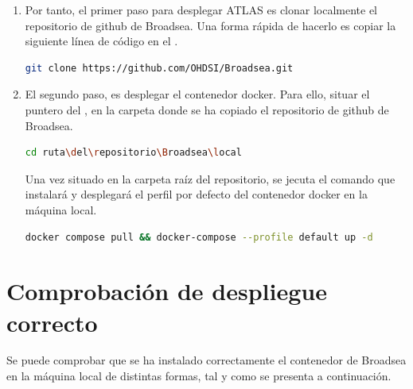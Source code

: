 \begin{enumerate}
    \item Por tanto, el primer paso para desplegar ATLAS es clonar localmente el repositorio de github de Broadsea. Una forma rápida de hacerlo es copiar la siguiente línea de código en el .

\begin{lstlisting}[language=sh]
        git clone https://github.com/OHDSI/Broadsea.git
\end{lstlisting}

    \item El segundo paso, es desplegar el contenedor docker. Para ello, situar el puntero del , en la carpeta donde se ha copiado el repositorio de github de Broadsea.

\begin{lstlisting}[language=sh]
        cd ruta\del\repositorio\Broadsea\local
\end{lstlisting}

    Una vez situado en la carpeta raíz del repositorio, se jecuta el comando que instalará y desplegará el perfil por defecto del contenedor docker en la máquina local.

\begin{lstlisting}[language=sh]
    docker compose pull && docker-compose --profile default up -d
\end{lstlisting}

\end{enumerate}

\section{Comprobación de despliegue correcto} \label{sec:02comprobacion} 

Se puede comprobar que se ha instalado correctamente el contenedor de Broadsea en la máquina local de distintas formas, tal y como se presenta a continuación.

